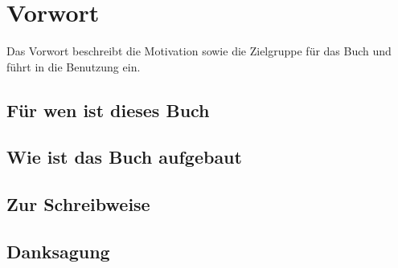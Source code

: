 \chapter{Vorwort}
\label{cha:vorwort}

\begin{abstractsec}
  Das Vorwort beschreibt die Motivation sowie die Zielgruppe für das Buch und
  führt in die Benutzung ein.
\end{abstractsec}

\section*{Für wen ist dieses Buch}

\section*{Wie ist das Buch aufgebaut}

\section*{Zur Schreibweise}

\section*{Danksagung}
